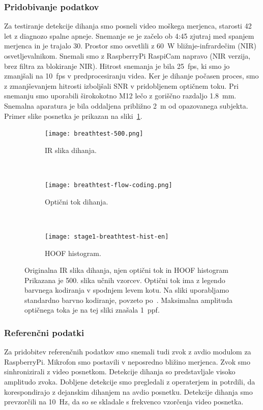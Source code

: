 \subsubsection{Pridobivanje podatkov}
Za testiranje detekcije dihanja smo posneli video moškega merjenca, starosti 42 let z diagnozo spalne apneje. Snemanje se je začelo ob 4:45 zjutraj med spanjem merjenca in je trajalo \SI{30}{\min}. Prostor smo osvetlili z \SI{60}{\W} bližnje-infrardečim (NIR) osvetljevalnikom. Snemali smo z RaspberryPi RaspiCam  napravo (NIR verzija, brez filtra za blokiranje NIR). Hitrost snemanja je bila \SI{25}{fps}, ki smo jo zmanjšali na \SI{10}{fps} v predprocesiranju videa. Ker je dihanje počasen proces, smo z zmanjševanjem hitrosti izboljšali SNR v pridobljenem optičnem toku. Pri snemanju smo uporabili širokokotno M12 lečo z goriščno razdaljo \SI{1.8}{mm}. Snemalna aparatura je bila oddaljena približno \SI{2}{m} od opazovanega subjekta. Primer slike posnetka je prikazan na sliki~\ref{fig:dihanje-orig}.

\begin{figure}[htb]
	\centering
	\begin{subfigure}[t]{0.3\columnwidth}
		\centering
		\texttt{[image: breathtest-500.png]}
		\caption{IR slika dihanja.}
		\label{fig:dihanje-orig}
	\end{subfigure}
	~
	\begin{subfigure}[t]{0.3\columnwidth}
		\centering
		\texttt{[image: breathtest-flow-coding.png]}
		\caption{Optični tok dihanja.}
		\label{fig:dihanje-of}
	\end{subfigure}
	~
	\begin{subfigure}[t]{0.3\columnwidth}
		\centering
		\texttt{[image: stage1-breathtest-hist-en]}
		\caption{HOOF histogram.}
		\label{fig:dihanje-hist}
	\end{subfigure}
	\caption[Originalna IR slika dihanja, njen optični tok in HOOF histogram]{Originalna IR slika dihanja, njen optični tok in HOOF histogram Prikazana je 500. slika učnih vzorcev. Optični tok ima z legendo barvnega kodiranja v spodnjem levem kotu. Na sliki uporabljamo standardno barvno kodiranje, povzeto po~\cite{baker2011database}. Maksimalna amplituda optičnega toka je na tej sliki znašala \SI{1}{ppf}.}
	\label{fig:dihanje}
\end{figure} 

\subsubsection{Referenčni podatki}
Za pridobitev referenčnih podatkov smo snemali tudi zvok z avdio modulom za RaspberryPi. Mikrofon smo postavili v neposredno bližino merjenca. Zvok smo sinhronizirali z video posnetkom. Detekcije dihanja so predstavljale visoko amplitudo zvoka. Dobljene detekcije smo pregledali z operaterjem in potrdili, da korespondirajo z dejanskim dihanjem na avdio posnetku. Detekcije dihanja smo prevzorčili na \SI{10}{Hz}, da so se skladale s frekvenco vzorčenja video posnetka.

